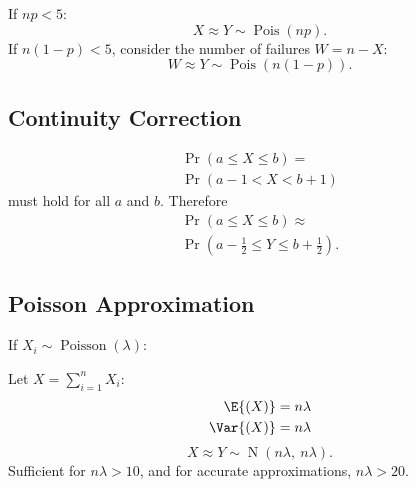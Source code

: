 \documentclass{article}
\begin{document}
\begin{minipage}{126.1962963mm}
\begin{multicols}{2}
        If \(np < 5\):
        \begin{equation*}
            X \approx Y \sim \operatorname{Pois}{\left( np \right)}.
        \end{equation*}
        If \(n\left( 1 - p \right) < 5\), consider the number of failures \(W = n - X\):
        \begin{equation*}
            W \approx Y \sim \operatorname{Pois}{\left( n\left( 1 - p \right) \right)}.
        \end{equation*}
        \subsection{Continuity Correction}
        \begin{multline*}
            \Pr{\left( a \leq X \leq b \right)} = \\
            \Pr{\left( a - 1 < X < b + 1 \right)}
        \end{multline*}
        must hold for all \(a\) and \(b\). Therefore
        \begin{multline*}
            \Pr{\left( a \leq X \leq b \right)} \approx \\
            \Pr{\left( a - \frac{1}{2} \leq Y \leq b + \frac{1}{2} \right)}.
        \end{multline*}
        \subsection{Poisson Approximation}
        If \(X_i \sim \operatorname{Poisson}{\left( \lambda \right)}\):

        Let \(X = \sum_{i = 1}^n X_i\):
        \begin{align*}
            \E{\left( X \right)}   & = n \lambda \\
            \Var{\left( X \right)} & = n \lambda
        \end{align*}
        \begin{equation*}
            X \approx Y \sim \operatorname{N}{\left( n\lambda,\: n\lambda \right)}.
        \end{equation*}
        Sufficient for \(n \lambda > 10\), and for accurate approximations, \(n \lambda > 20\).
    \end{multicols}
\end{minipage}
\end{document}
